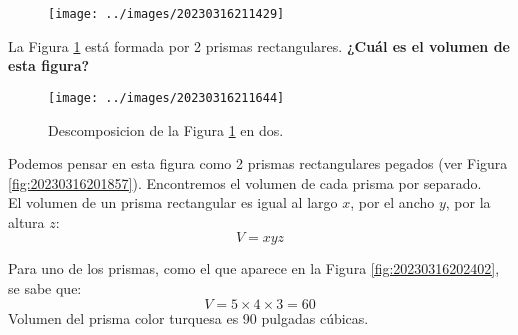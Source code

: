 \begin{multicols}{2}
    \begin{figure}[H]
        \centering
        \texttt{[image: ../images/20230316211429]}
        \caption{}
        \label{fig:20230316211429}
    \end{figure}
    \columnbreak
    \question[10] La Figura \ref{fig:20230316211429} está formada por 2 prismas rectangulares.
    \textbf{¿Cuál es el volumen de esta figura?}
\end{multicols}

\begin{solutionbox}{16cm}
    \begin{minipage}[t]{.3\textwidth}
        \begin{figure}[H]
            \centering
            \texttt{[image: ../images/20230316211644]}
            \caption{Descomposicion de la Figura \ref{fig:20230316211429} en dos.}
            \label{fig:20230316211644}
        \end{figure}
    \end{minipage}\hfill
    \begin{minipage}[t]{.55\textwidth}
        Podemos pensar en esta figura como 2 prismas rectangulares pegados (ver Figura \ref{fig:20230316201857}). Encontremos el volumen de cada prisma por separado.\\
        El volumen de un prisma rectangular es igual al largo $x$, por el ancho $y$, por la altura $z$:
        \[ V = xyz \]

        Para uno de los prismas, como el que aparece en la Figura \ref{fig:20230316202402}, se sabe que:\\
        \[ V = 5\times 4\times 3=60\]
        Volumen del prisma color turquesa es 90 pulgadas cúbicas.\\


\end{minipage}
\end{solutionbox}
